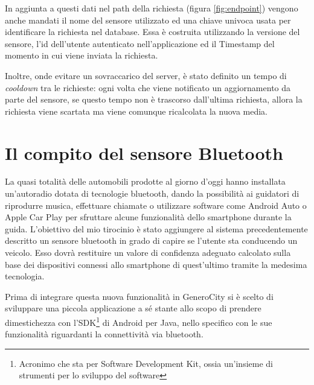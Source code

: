 In aggiunta a questi dati nel path della richiesta (figura \ref{fig:endpoint}) vengono anche mandati il nome del sensore utilizzato ed una chiave univoca usata per identificare la richiesta nel database. Essa è costruita utilizzando la versione del sensore, l'id dell'utente autenticato nell'applicazione ed il Timestamp del momento in cui viene inviata la richiesta.

Inoltre, onde evitare un sovraccarico del server, è stato definito un tempo di \textit{cooldown} tra le richieste: ogni volta che viene notificato un aggiornamento da parte del sensore, se questo tempo non è trascorso dall'ultima richiesta, allora la richiesta viene scartata ma viene comunque ricalcolata la nuova media.

\section{Il compito del sensore Bluetooth}
La quasi totalità delle automobili prodotte al giorno d'oggi hanno installata un'autoradio dotata di tecnologie bluetooth, dando la possibilità ai guidatori di riprodurre musica, effettuare chiamate o utilizzare software come Android Auto o Apple Car Play per sfruttare alcune funzionalità dello smartphone durante la guida.\cite{ref:car-bluetooth} L'obiettivo del mio tirocinio è stato aggiungere al sistema precedentemente descritto un sensore bluetooth in grado di capire se l'utente sta conducendo un veicolo. Esso dovrà restituire un valore di confidenza adeguato calcolato sulla base dei dispositivi connessi allo smartphone di quest'ultimo tramite la medesima tecnologia.

Prima di integrare questa nuova funzionalità in GeneroCity si è scelto di sviluppare una piccola applicazione a sé stante allo scopo di prendere dimestichezza con l'SDK\footnote{Acronimo che sta per Software Development Kit, ossia un'insieme di strumenti per lo sviluppo del software} di Android per Java, nello specifico con le sue funzionalità riguardanti la connettività via bluetooth.
